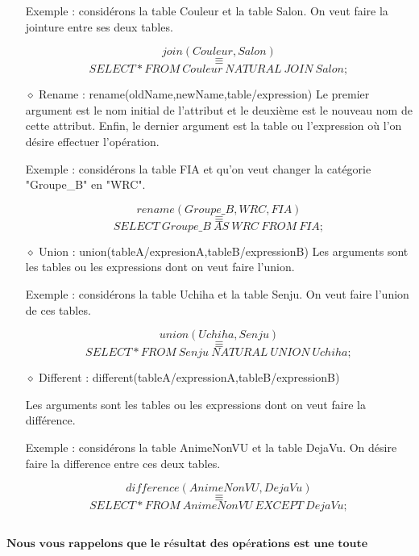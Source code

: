 \documentclass[10pt,a4paper]{article}
\begin{document}
\begin{itemize}
Exemple : considérons la table Couleur et la table Salon. On veut faire la jointure entre ses deux tables.

\[
join(Couleur,Salon)
\]
\[
\equiv
\]
\[
SELECT * FROM\ Couleur\ NATURAL\ JOIN\ Salon; 
\]


\item[$\diamond$] Rename : rename(oldName,newName,table/expression)
Le premier argument est le nom initial de l'attribut et le deuxième est le nouveau nom de cette attribut. Enfin, le dernier argument est la table ou l'expression où l'on désire effectuer l'opération.

Exemple : considérons la table FIA et qu'on veut changer la catégorie "Groupe\_B" en "WRC".

\[
rename(Groupe\_B,WRC,FIA)
\]
\[
\equiv
\]
\[
SELECT\ Groupe\_B\ AS\ WRC\ FROM\ FIA; 
\]

\item[$\diamond$] Union : union(tableA/expresionA,tableB/expressionB)
Les arguments sont les tables ou les expressions dont on veut faire l'union.

Exemple : considérons la table Uchiha et la table Senju. On veut faire l'union de ces tables.

\[
union(Uchiha,Senju)
\]
\[
\equiv
\]
\[
SELECT * FROM\ Senju\ NATURAL\ UNION\ Uchiha; 
\]

\item[$\diamond$] Different : different(tableA/expressionA,tableB/expressionB)

Les arguments sont les tables ou les expressions dont on veut faire la différence. 

Exemple : considérons la table AnimeNonVU et la table DejaVu. On désire faire la difference entre ces deux tables.

\[
difference(AnimeNonVU,DejaVu)
\]
\[
\equiv
\]
\[
SELECT * FROM\ AnimeNonVU\ EXCEPT\ DejaVu; 
\]\\[1mm]
\end{itemize}

$\textbf{Nous vous rappelons que le résultat des opérations est une toute nouvelle table.}$
\end{document}

